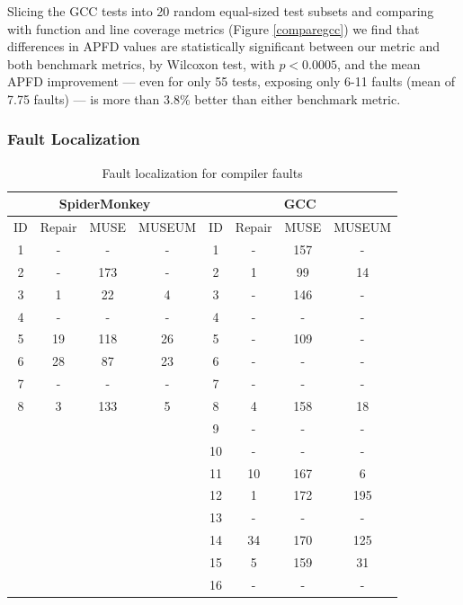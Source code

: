 Slicing the GCC tests into 20 random equal-sized test subsets and comparing with function and line coverage metrics (Figure \ref{comparegcc}) we find that differences in APFD values are statistically significant between our metric and both benchmark metrics, by Wilcoxon test, with $p < 0.0005$, and the mean APFD improvement --- even for only 55 tests, exposing only 6-11 faults (mean of 7.75 faults) --- is more than 3.8\% better than either benchmark metric.


\subsubsection{Fault Localization}

\begin{table}
\caption{Fault localization for compiler faults}
\centering
{\scriptsize
\begin{tabular}{|c||c|c|c||c||c|c|c|}
\hline
\multicolumn{4}{|c||}{SpiderMonkey}&\multicolumn{4}{|c|}{GCC}\\
\hline
ID& Repair & MUSE & MUSEUM & ID & Repair & MUSE & MUSEUM \\
\hline
1 & - & - & - &         1 & - & 157 & -\\
2 & - & 173 & - &     2 & 1 & 99 & 14\\
3 & 1 & 22 & 4 &       3 & - & 146 & -\\
4 & - & - & - &         4 &  - & - & -\\
5 & 19 & 118 & 26 & 5 & - & 109 & -\\
6 & 28 & 87 & 23 &   6 & - & - & -\\
7 & - & - & - &         7 & - & - & -\\
8 & 3 & 133 & 5 &     8 & 4 & 158 & 18\\
& & & & 9 & - & - & -\\
& & & & 10 & - & - & -\\
& & & & 11 & 10 & 167 & 6\\
& & & & 12 & 1 & 172 & 195\\
& & & & 13 & - & - & -\\
& & & & 14 & 34 & 170 & 125\\
& & & & 15 &  5 & 159 & 31\\
& & & & 16 & - & - & -\\
\hline
\end{tabular}
}
\label{bothtable}
\end{table}

